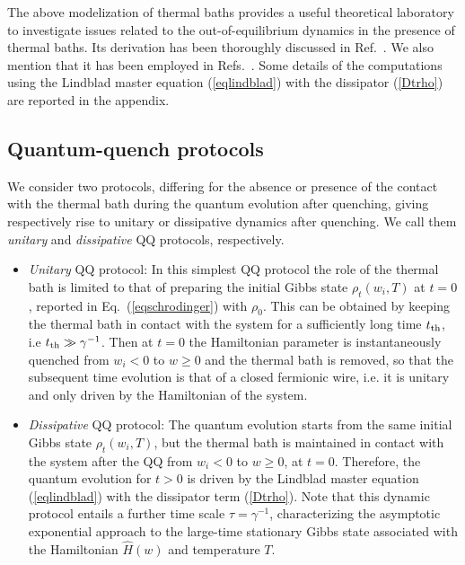 The above modelization of thermal baths provides a useful theoretical
laboratory to investigate issues related to the out-of-equilibrium
dynamics in the presence of thermal baths. Its derivation has
been thoroughly discussed in Ref.~\cite{dr2021self}. We also mention that it
has been employed in Refs.~\cite{CPR-2022-otto_engine,BD-23}.  Some details of the
computations using the Lindblad master equation (\ref{eqlindblad}) with
the dissipator (\ref{Dtrho}) are reported in the appendix.


\subsection{Quantum-quench protocols}
\label{proto}

We consider two protocols,
differing for the absence or presence of the contact with the thermal
bath during the quantum evolution after quenching, giving respectively
rise to unitary or dissipative dynamics after quenching. We call them
{\em unitary} and {\em dissipative} QQ protocols, respectively.

\begin{itemize}

\item {\em Unitary} QQ protocol: In this simplest QQ protocol the role
  of the thermal bath is limited to that of preparing the initial
  Gibbs state $\rho_t(w_i,T)$ at $t=0$, reported in
  Eq.~(\ref{eqschrodinger}) with $\rho_0$. This can be obtained by keeping the thermal bath
  in contact with the system for a sufficiently long time $t_{\rm th}$, i.e
  $t_{\rm th}\gg \gamma^{-1}$. Then at $t=0$ the Hamiltonian parameter is
  instantaneously quenched from $w_i<0$ to $w\ge 0$ and the thermal
  bath is removed, so that the subsequent time evolution is that of a
  closed fermionic wire, i.e.  it is unitary and only driven by the
  Hamiltonian of the system.%

\item {\em Dissipative} QQ protocol: The quantum evolution starts from
  the same initial Gibbs state $\rho_t(w_i,T)$, but the thermal bath
  is maintained in contact with the system after the QQ from $w_i<0$
  to $w\ge 0$, at $t=0$.  Therefore, the quantum evolution for $t>0$
  is driven by the Lindblad master equation (\ref{eqlindblad}) with the
  dissipator term (\ref{Dtrho}). Note that this dynamic protocol
  entails a further time scale $\tau = \gamma^{-1}$, characterizing
  the asymptotic exponential approach to the large-time stationary
  Gibbs state associated with the Hamiltonian $\hat{H}(w)$ and
  temperature $T$.

\end{itemize}


